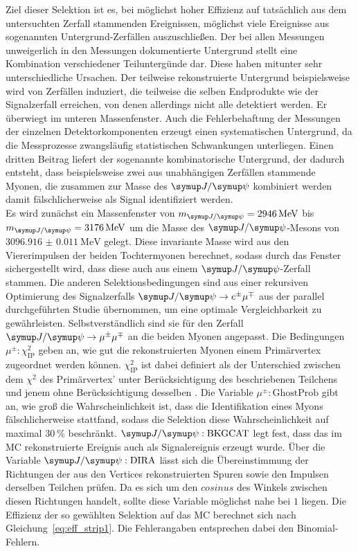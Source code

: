 Ziel dieser Selektion ist es, bei möglichst hoher Effizienz auf tatsächlich aus dem untersuchten Zerfall stammenden Ereignissen, möglichst viele Ereignisse aus sogenannten Untergrund-Zerfällen auszuschließen. Der bei allen Messungen unweigerlich in den Messungen dokumentierte Untergrund stellt eine Kombination verschiedener Teiluntergünde dar. Diese haben mitunter sehr unterschiedliche Ursachen. Der teilweise rekonstruierte Untergrund beispielsweise wird von Zerfällen induziert, die teilweise die selben Endprodukte wie der Signalzerfall erreichen, von denen allerdings nicht alle detektiert werden. Er überwiegt im unteren Massenfenster. Auch die Fehlerbehaftung der Messungen der einzelnen Detektorkomponenten erzeugt einen systematischen Untergrund, da die Messprozesse zwangsläufig statistischen Schwankungen unterliegen. Einen dritten Beitrag liefert der sogenannte kombinatorische Untergrund, der dadurch entsteht, dass beispielsweise zwei aus unabhängigen Zerfällen stammende Myonen, die zusammen zur Masse des $\jpsi$ kombiniert werden damit fälschlicherweise als Signal identifiziert werden.\\
Es wird zunächst ein Massenfenster von $m_{\jpsi}=\SI{2946}{\mega\electronvolt}$ bis $m_{\jpsi}=\SI{3176}{\mega\electronvolt}$ um die Masse des $\jpsi$-Mesons von $\SI{3096.916(11)}{\mega\electronvolt}$ \cite{pdg} gelegt. Diese invariante Masse wird aus den Viererimpulsen der beiden Tochtermyonen berechnet, sodass durch das Fenster sichergestellt wird, dass diese auch aus einem $\jpsi$-Zerfall stammen. Die anderen Selektionsbedingungen sind aus einer rekursiven Optimierung des Signalzerfalls $\signal$ aus der parallel durchgeführten Studie \cite{ba-maik} übernommen, um eine optimale Vergleichbarkeit zu gewährleisten. Selbstverständlich sind sie für den Zerfall $\kontroll$ an die beiden Myonen angepasst.
Die Bedingungen $\mu^{\pm}:\chi_{\text{IP}}^2$ geben an, wie gut die rekonstruierten Myonen einem Primärvertex zugeordnet werden können. $\chi_{\text{IP}}^2$ ist dabei definiert als der Unterschied zwischen dem $\chi^2$ des Primärvertex' unter Berücksichtigung des beschriebenen
Teilchens und jenem ohne Berücksichtigung desselben \cite{chi2}. Die Variable $\mu^{\pm}:\text{GhostProb}$ gibt an, wie groß die Wahrscheinlichkeit
ist, dass die Identifikation eines Myons fälschlicherweise stattfand, sodass die Selektion diese Wahrscheinlichkeit auf maximal $\SI{30}{\percent}$
beschränkt. $\jpsi:\text{BKGCAT}$ legt fest, dass das im MC rekonstruierte Ereignis auch als Signalereignis erzeugt wurde. Über die Variable $\jpsi:\text{DIRA}$ lässt sich die Übereinstimmung der Richtungen der aus den Vertices rekonstruierten Spuren sowie den Impulsen derselben Teilchen prüfen. Da es sich um den $cosinus$ des Winkels zwischen diesen Richtungen handelt, sollte diese Variable möglichst nahe bei $1$ liegen. Die Effizienz der so gewählten Selektion auf das MC berechnet sich nach Gleichung~\eqref{eq:eff_strip1}. Die Fehlerangaben entsprechen dabei den Binomial-Fehlern.
